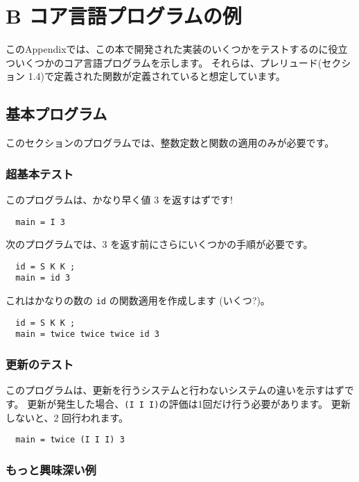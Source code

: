 \documentclass{jarticle}
\begin{document}
\section{B コア言語プログラムの例}

このAppendixでは、この本で開発された実装のいくつかをテストするのに役立ついくつかのコア言語プログラムを示します。
それらは、プレリュード(セクション 1.4)で定義された関数が定義されていると想定しています。

\subsection{基本プログラム}

このセクションのプログラムでは、整数定数と関数の適用のみが必要です。

\subsubsection{超基本テスト}

このプログラムは、かなり早く値 3 を返すはずです!

\begin{verbatim}
  main = I 3
\end{verbatim}

次のプログラムでは、3 を返す前にさらにいくつかの手順が必要です。

\begin{verbatim}
  id = S K K ;
  main = id 3
\end{verbatim}

これはかなりの数の \texttt{id} の関数適用を作成します (いくつ?)。

\begin{verbatim}
  id = S K K ;
  main = twice twice twice id 3
\end{verbatim}

\subsubsection{更新のテスト}

このプログラムは、更新を行うシステムと行わないシステムの違いを示すはずです。
更新が発生した場合、\texttt{(I I I)}の評価は1回だけ行う必要があります。
更新しないと、2 回行われます。

\begin{verbatim}
  main = twice (I I I) 3
\end{verbatim}

\subsubsection{もっと興味深い例}
\end{document}
